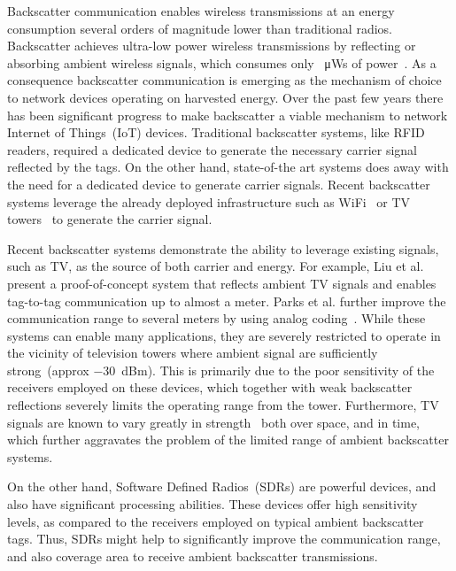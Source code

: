 Backscatter communication enables wireless transmissions
at an energy consumption several orders of magnitude
lower than traditional radios. Backscatter achieves ultra-low
power wireless transmissions by reflecting or absorbing ambient
wireless signals, which consumes only 
\SI{}{\micro\watt}s of power~\cite{liu_ambient_2013}. 
As a consequence backscatter
communication is emerging as the mechanism of choice to network
devices operating on harvested energy.  
Over the past few years there has been significant progress
to make backscatter a viable mechanism to network Internet of
Things~(IoT) devices. Traditional backscatter systems, like RFID readers, required a
dedicated device to generate the necessary carrier signal
reflected by the tags. On the other hand, state-of-the art systems does away
with the need for a dedicated device to generate carrier signals.  Recent
backscatter systems leverage the already deployed infrastructure such as
WiFi~\cite{hitchhike,kellogg2015wi} or TV
towers~\cite{liu_ambient_2013,parks_turbocharging_2014} to generate the carrier
signal. %

Recent backscatter systems demonstrate the ability to leverage
existing signals, such as TV, as the source of both carrier and energy. For
example, Liu et al. present a proof-of-concept system that reflects
ambient TV signals and enables tag-to-tag communication up to almost a
meter. Parks et al. further improve the communication range to several
meters by using analog coding~\cite{parks_turbocharging_2014}. While
these systems can enable many applications, they are severely restricted
to operate in the vicinity of television towers where ambient signal
are sufficiently strong~(approx
\SI{-30}{dBm}). This is primarily due to the poor sensitivity of the receivers
employed on these devices, which together with weak backscatter reflections 
severely limits the operating range from the tower.
Furthermore, TV signals are known to vary greatly in
strength~\cite{wang_fm_2017} both over space, and in time,  which further aggravates the
problem of the limited range of ambient backscatter systems.

On the other hand, Software Defined Radios~(SDRs) are powerful devices, and also
have significant processing abilities. These devices offer high
sensitivity levels, as compared to the receivers employed on typical 
ambient backscatter tags. Thus, SDRs might help to
significantly improve the communication range, and also coverage 
area to receive ambient backscatter transmissions. 

